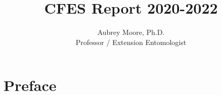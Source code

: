 \usepackage[sorting=none, maxbibnames=99]{biblatex}





\usepackage[breaklinks=true, colorlinks=True, allcolors=blue]{hyperref}

\usepackage{indentfirst} 
\usepackage{comment}

\newcommand{\activities}{\medskip\textbf{Activities}}
\newcommand{\plans}{\medskip\textbf{Plans}}

\makeatletter

\makeatother




\title{CFES Report 2020-2022}

\author{Aubrey Moore, Ph.D.\\
Professor / Extension Entomologist}

\maketitle



\setcounter{tocdepth}{2}
\tableofcontents{}

\clearpage


\section{Preface}
	
